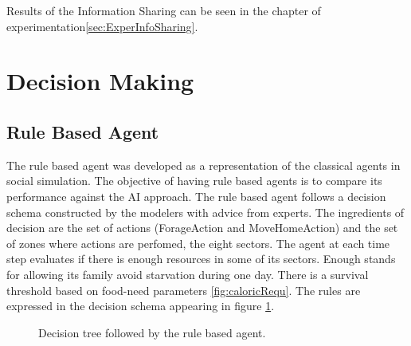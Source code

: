 \documentclass[11pt,oneside,a4paper,openright]{report}
\begin{document}
Results of the Information Sharing can be seen in the chapter of experimentation\ref{sec:ExperInfoSharing}.

\section{Decision Making}

\subsection{Rule Based Agent}

The rule based agent was developed as a representation of the classical agents in social simulation. The objective of having rule based agents is to compare its performance against the AI approach.
The rule based agent follows a decision schema constructed by the modelers with advice from experts.
The ingredients of decision are the set of actions (ForageAction and MoveHomeAction) and the set of zones where actions are perfomed, the eight sectors. The agent at each time step evaluates if there is enough resources in some of its sectors. Enough stands for allowing its family avoid starvation during one day. There is a survival threshold based on food-need parameters \ref{fig:caloricRequ}. The rules are expressed in the decision schema appearing in figure \ref{fig:decisionTree}.


	\begin{figure}[h!]
	\centering
	\setlength\fboxsep{0pt}
	\setlength\fboxrule{0.5pt}
	\caption{Decision tree followed by the rule based agent.}
	\label{fig:decisionTree}
	\end{figure}
\end{document}
